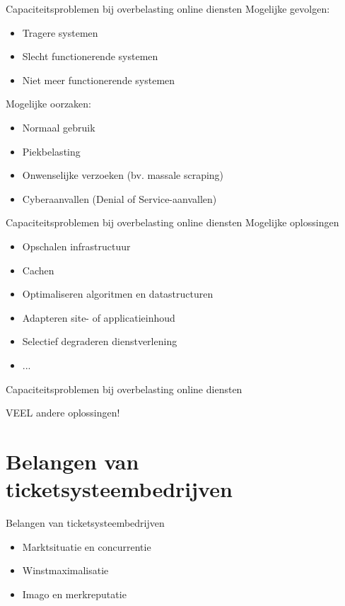 \documentclass{beamer}
\begin{document}
\begin{frame}{Capaciteitsproblemen bij overbelasting online diensten}
    Mogelijke gevolgen:
    \begin{itemize}
        \item Tragere systemen
        \item Slecht functionerende systemen
        \item Niet meer functionerende systemen
    \end{itemize}

    Mogelijke oorzaken:
    \begin{itemize}
        \item Normaal gebruik
        \item Piekbelasting
        \item Onwenselijke verzoeken (bv. massale scraping)
        \item Cyberaanvallen (Denial of Service-aanvallen)
    \end{itemize}
\end{frame}


\begin{frame}{Capaciteitsproblemen bij overbelasting online diensten}
    Mogelijke oplossingen
    \begin{itemize}
        \item Opschalen infrastructuur
        \item Cachen
        \item Optimaliseren algoritmen en datastructuren
        \item Adapteren site- of applicatieinhoud
        \item Selectief degraderen dienstverlening
        \item ...
    \end{itemize}
\end{frame}


\begin{frame}{Capaciteitsproblemen bij overbelasting online diensten}
    \begin{center}
        \alert{VEEL andere oplossingen!}
    \end{center}
\end{frame}


\section[Bedrijf]{Belangen van ticketsysteembedrijven}
\begin{frame}{Belangen van ticketsysteembedrijven}
    \begin{itemize}
        \item Marktsituatie en concurrentie
        \item Winstmaximalisatie
        \item Imago en merkreputatie
    \end{itemize}
\end{frame}
\end{document}
